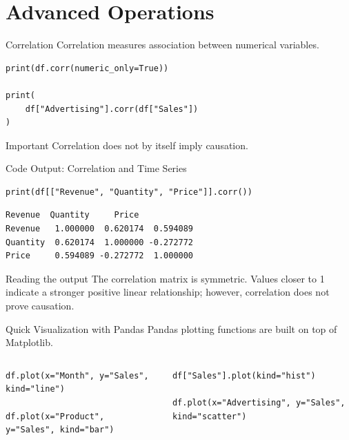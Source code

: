 \documentclass[aspectratio=169,11pt]{beamer}
\begin{document}
\section{Advanced Operations}

\begin{frame}[fragile]{Correlation}
\small
Correlation measures association between numerical variables.
\begin{lstlisting}[style=py]
print(df.corr(numeric_only=True))

print(
    df["Advertising"].corr(df["Sales"])
)
\end{lstlisting}
\begin{alertblock}{Important}
Correlation does not by itself imply causation.
\end{alertblock}
\end{frame}

\begin{frame}[fragile]{Code Output: Correlation and Time Series}
\small
\begin{lstlisting}[style=py]
print(df[["Revenue", "Quantity", "Price"]].corr())
\end{lstlisting}
\begin{lstlisting}[style=py]
           Revenue  Quantity     Price
Revenue   1.000000  0.620174  0.594089
Quantity  0.620174  1.000000 -0.272772
Price     0.594089 -0.272772  1.000000
\end{lstlisting}
\begin{block}{Reading the output}
The correlation matrix is symmetric. Values closer to 1 indicate a stronger positive linear relationship; however, correlation does not prove causation.
\end{block}
\end{frame}

\begin{frame}[fragile]{Quick Visualization with Pandas}
\small
Pandas plotting functions are built on top of Matplotlib.
\begin{columns}[T]
\begin{lstlisting}[style=py]
df.plot(x="Month", y="Sales", kind="line")

df.plot(x="Product", y="Sales", kind="bar")
\end{lstlisting}
\begin{lstlisting}[style=py]
df["Sales"].plot(kind="hist")

df.plot(x="Advertising", y="Sales", kind="scatter")
\end{lstlisting}
\end{columns}
\end{frame}
\end{document}

